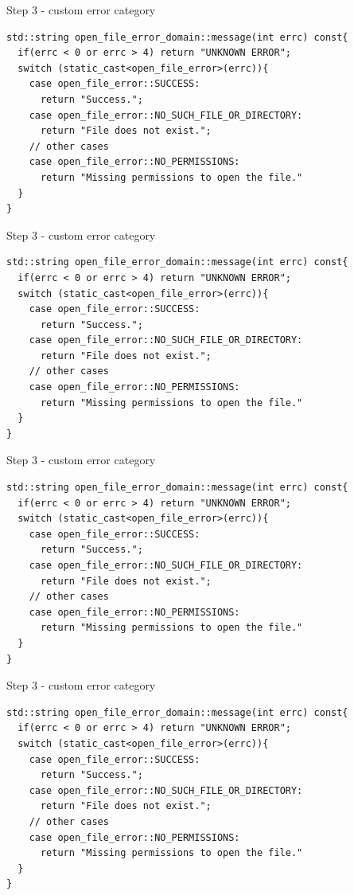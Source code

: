 \documentclass[10pt]{beamer}
\begin{document}
\begin{frame}[fragile]{Step 3 - custom error category}
	\begin{verbatim}
std::string open_file_error_domain::message(int errc) const{
  if(errc < 0 or errc > 4) return "UNKNOWN ERROR";
  switch (static_cast<open_file_error>(errc)){
    case open_file_error::SUCCESS:
      return "Success.";
    case open_file_error::NO_SUCH_FILE_OR_DIRECTORY:
      return "File does not exist.";
    // other cases
    case open_file_error::NO_PERMISSIONS:
      return "Missing permissions to open the file."
  }
}
	\end{verbatim}
\end{frame}

\begin{frame}[fragile]{Step 3 - custom error category}
\begin{verbatim}
std::string open_file_error_domain::message(int errc) const{
  if(errc < 0 or errc > 4) return "UNKNOWN ERROR";
  switch (static_cast<open_file_error>(errc)){
    case open_file_error::SUCCESS:
      return "Success.";
    case open_file_error::NO_SUCH_FILE_OR_DIRECTORY:
      return "File does not exist.";
    // other cases
    case open_file_error::NO_PERMISSIONS:
      return "Missing permissions to open the file."
  }
}
\end{verbatim}
\end{frame}

\begin{frame}[fragile]{Step 3 - custom error category}
\begin{verbatim}
std::string open_file_error_domain::message(int errc) const{
  if(errc < 0 or errc > 4) return "UNKNOWN ERROR";
  switch (static_cast<open_file_error>(errc)){
    case open_file_error::SUCCESS:
      return "Success.";
    case open_file_error::NO_SUCH_FILE_OR_DIRECTORY:
      return "File does not exist.";
    // other cases
    case open_file_error::NO_PERMISSIONS:
      return "Missing permissions to open the file."
  }
}
\end{verbatim}
\end{frame}

\begin{frame}[fragile]{Step 3 - custom error category}
\begin{verbatim}
std::string open_file_error_domain::message(int errc) const{
  if(errc < 0 or errc > 4) return "UNKNOWN ERROR";
  switch (static_cast<open_file_error>(errc)){
    case open_file_error::SUCCESS:
      return "Success.";
    case open_file_error::NO_SUCH_FILE_OR_DIRECTORY:
      return "File does not exist.";
    // other cases
    case open_file_error::NO_PERMISSIONS:
      return "Missing permissions to open the file."
  }
}
\end{verbatim}
\end{frame}
\end{document}
